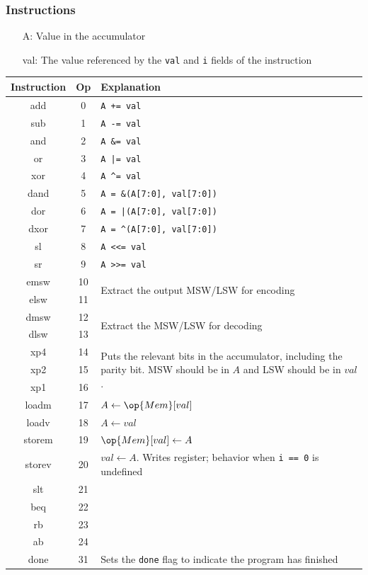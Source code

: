 	\begin{frame}[fragile]
		\frametitle{Instructions}

		\begin{itemize}
			\small
			\item[A:] Value in the accumulator
			\item[val:] The value referenced by the \texttt{val} and \texttt{i} fields of the instruction \\
		\end{itemize}

		\begin{table}[]
			\tiny
			\begin{tabular}{|c|c|l|}
				\hline
				Instruction & Op & Explanation \\ \hline
				add & 0 & \texttt{A += val} \\
				sub & 1 & \texttt{A -= val} \\ \hline
				and & 2 & \texttt{A \&= val} \\
				or & 3 & \texttt{A |= val} \\
				xor & 4 & \verb|A ^= val| \\ \hline
				dand & 5 & \verb|A = &(A[7:0], val[7:0])| \\
				dor & 6 & \verb/A = |(A[7:0], val[7:0]) / \\
				dxor & 7 & \verb|A = ^(A[7:0], val[7:0])| \\ \hline
				sl & 8 & \verb|A <<= val| \\
				sr & 9 & \verb|A >>= val| \\ \hline
				emsw & 10 & \multirow{2}{25em}{Extract the output MSW/LSW for encoding} \\
				elsw & 11 & \\
				dmsw & 12 & \multirow{2}{25em}{Extract the MSW/LSW for decoding} \\
				dlsw & 13 & \\ \hline
				xp4 & 14 & \multirow{3}{25em}{Puts the relevant bits in the accumulator, including the parity bit. MSW should be in $A$ and LSW should be in $val$.} \\
				xp2 & 15 & \\
				xp1 & 16 & \\ \hline
				loadm & 17 & $A \leftarrow \op{Mem}[val]$ \\
				loadv & 18 & $A \leftarrow val$ \\
				storem & 19 & $\op{Mem}[val] \leftarrow A$ \\
				storev & 20 & $val \leftarrow A$. Writes register; behavior when \verb|i == 0| is undefined \\ \hline
				slt & 21 & \\
				beq & 22 & \\
				rb & 23 & \\
				ab & 24 & \\ \hline
				done & 31 & Sets the \verb|done| flag to indicate the program has finished \\
				\hline
			\end{tabular}
		\end{table}
	\end{frame}

